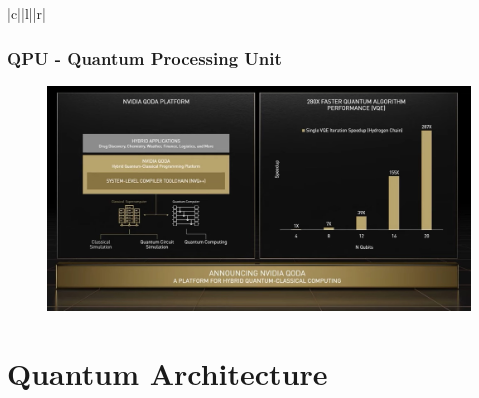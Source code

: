 \documentclass[xcolor=x11names,table]{beamer}
\begin{document}
	\begin{frame}{|c||l||r|}
		\frametitle{QPU - Quantum Processing Unit}
		\begin{figure}[p]
			\centering
			\includegraphics[width=\linewidth,height=\dimexpr\textheight-2\baselineskip-\abovecaptionskip-\belowcaptionskip\relax,keepaspectratio]{refs/QODA-slide-BEST-scaled.jpg}
			\label{fig:qpu-architecture-nvidia-qoda}
		\end{figure}
	\end{frame}
	
	\section{Quantum Architecture}
	
\end{document}

